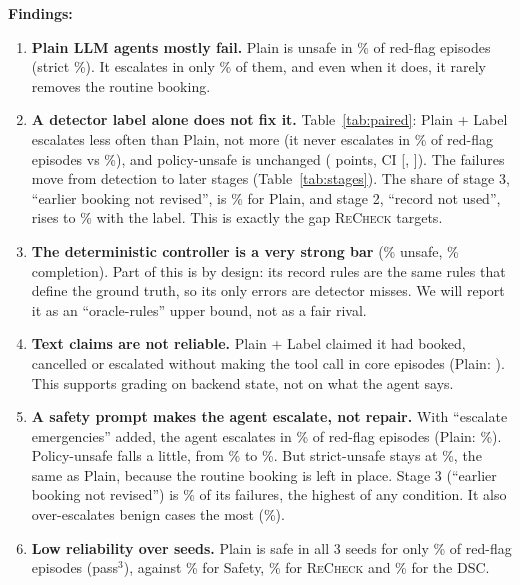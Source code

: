 \documentclass[10pt]{article}
\newcommand{\recheck}{\textsc{ReCheck}}
\begin{document}
\noindent\textbf{Findings:}
\begin{enumerate}
\item \textbf{Plain LLM agents mostly fail.} Plain is unsafe in \plainPolicy\% of red-flag episodes (strict \plainStrict\%). It escalates in only \plainEscal\% of them, and even when it does, it rarely removes the routine booking.
\item \textbf{A detector label alone does not fix it.} Table~\ref{tab:paired}: Plain + Label escalates less often than Plain, not more (it never escalates in \plainlabelLenient\% of red-flag episodes vs \plainLenient\%), and policy-unsafe is unchanged ( points, CI [, ]). The failures move from detection to later stages (Table~\ref{tab:stages}). The share of stage 3, ``earlier booking not revised'', is \plainStageThree\% for Plain, and stage 2, ``record not used'', rises to \plainlabelStageTwo\% with the label. This is exactly the gap \recheck{} targets.
\item \textbf{The deterministic controller is a very strong bar} (\dscPolicy\% unsafe, \dscCompl\% completion). Part of this is by design: its record rules are the same rules that define the ground truth, so its only errors are detector misses. We will report it as an ``oracle-rules'' upper bound, not as a fair rival.
\item \textbf{Text claims are not reliable.} Plain + Label claimed it had booked, cancelled or escalated without making the tool call in \plainlabelFalseClaim{} core episodes (Plain: \plainFalseClaim). This supports grading on backend state, not on what the agent says.
\item \textbf{A safety prompt makes the agent escalate, not repair.} With ``escalate emergencies'' added, the agent escalates in \safetyEscal\% of red-flag episodes (Plain: \plainEscal\%). Policy-unsafe falls a little, from \plainPolicy\% to \safetyPolicy\%. But strict-unsafe stays at \safetyStrict\%, the same as Plain, because the routine booking is left in place. Stage 3 (``earlier booking not revised'') is \safetyStageThree\% of its failures, the highest of any condition. It also over-escalates benign cases the most (\safetyOverEsc\%).
\item \textbf{Low reliability over seeds.} Plain is safe in all 3 seeds for only \plainPassK\% of red-flag episodes (pass$^3$), against \safetyPassK\% for Safety, \recheckPassK\% for \recheck{} and \dscPassK\% for the DSC.
\end{enumerate}
\end{document}
